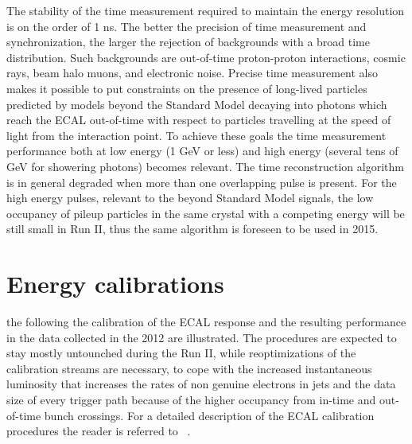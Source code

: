 \documentclass[journal]{IEEEtran}
\begin{document}
The stability of the time measurement required to maintain the energy resolution is on the order of 1 ns. The better the precision of time measurement and synchronization, the larger the rejection of backgrounds with a broad time distribution. Such backgrounds are out-of-time proton-proton interactions, cosmic rays, beam halo muons, and electronic noise. Precise time measurement also makes it possible to put constraints on the presence of long-lived particles predicted by models beyond the Standard Model decaying into photons which reach the ECAL  out-of-time with respect to particles travelling at the speed of light from the interaction point. To achieve these goals the time measurement performance both at low energy (1 GeV or less) and high energy (several tens of GeV for showering photons) becomes relevant.
The time reconstruction algorithm is in general degraded when more than one overlapping pulse is present.  For the high energy pulses, relevant to the beyond Standard Model signals, the low occupancy of pileup particles in the same crystal with a competing energy will be still small in Run II, thus the same algorithm is foreseen to be used in 2015.


\section{Energy calibrations}
 the following the calibration of the ECAL response and the resulting performance in the data collected in the 2012 are illustrated. The procedures are expected to stay mostly untounched during the Run II, while reoptimizations of the calibration streams are necessary, to cope with the increased instantaneous luminosity that increases the rates of non genuine electrons in jets and the data size of every trigger path because of the higher occupancy from in-time and out-of-time bunch crossings. For a detailed description of the ECAL calibration procedures the reader is referred to ~\cite{Chatrchyan:2013dga}.
\end{document}
